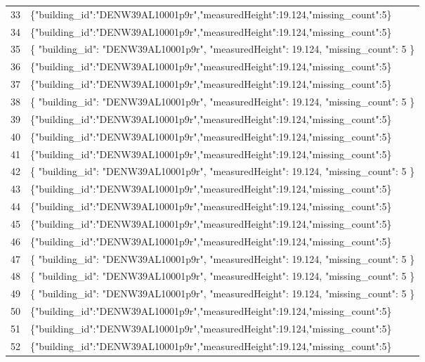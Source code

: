 \documentclass[a4paper,11pt]{article}
\begin{document}
\begin{table}[ht]
\begin{tabular}{r p{12cm}}
33 & \{"building\_id":"DENW39AL10001p9r","measuredHeight":19.124,"missing\_count":5\} \\
34 & \{"building\_id":"DENW39AL10001p9r","measuredHeight":19.124,"missing\_count":5\} \\
35 & \{
  "building\_id": "DENW39AL10001p9r",
  "measuredHeight": 19.124,
  "missing\_count": 5
\} \\
36 & \{"building\_id":"DENW39AL10001p9r","measuredHeight":19.124,"missing\_count":5\} \\
37 & \{"building\_id":"DENW39AL10001p9r","measuredHeight":19.124,"missing\_count":5\} \\
38 & \{
  "building\_id": "DENW39AL10001p9r",
  "measuredHeight": 19.124,
  "missing\_count": 5
\} \\
39 & \{"building\_id":"DENW39AL10001p9r","measuredHeight":19.124,"missing\_count":5\} \\
40 & \{"building\_id":"DENW39AL10001p9r","measuredHeight":19.124,"missing\_count":5\} \\
41 & \{"building\_id":"DENW39AL10001p9r","measuredHeight":19.124,"missing\_count":5\} \\
42 & \{
  "building\_id": "DENW39AL10001p9r",
  "measuredHeight": 19.124,
  "missing\_count": 5
\} \\
43 & \{"building\_id":"DENW39AL10001p9r","measuredHeight":19.124,"missing\_count":5\} \\
44 & \{"building\_id":"DENW39AL10001p9r","measuredHeight":19.124,"missing\_count":5\} \\
45 & \{"building\_id":"DENW39AL10001p9r","measuredHeight":19.124,"missing\_count":5\} \\
46 & \{"building\_id":"DENW39AL10001p9r","measuredHeight":19.124,"missing\_count":5\} \\
47 & \{
  "building\_id": "DENW39AL10001p9r",
  "measuredHeight": 19.124,
  "missing\_count": 5
\} \\
48 & \{
  "building\_id": "DENW39AL10001p9r",
  "measuredHeight": 19.124,
  "missing\_count": 5
\} \\
49 & \{
  "building\_id": "DENW39AL10001p9r",
  "measuredHeight": 19.124,
  "missing\_count": 5
\} \\
50 & \{"building\_id":"DENW39AL10001p9r","measuredHeight":19.124,"missing\_count":5\} \\
51 & \{"building\_id":"DENW39AL10001p9r","measuredHeight":19.124,"missing\_count":5\} \\
52 & \{"building\_id":"DENW39AL10001p9r","measuredHeight":19.124,"missing\_count":5\} \\

\end{tabular}
\end{table}
\end{document}

